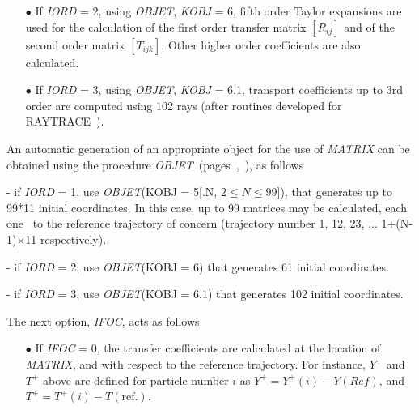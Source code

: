{\begin{itemize}
\begin{eqnarray}
\Delta \phi_Y =  A\!\tan \dfrac{R_{12}}{(R_{11}\beta_{Y,\textsl{objet}} - R_{12}\alpha_{Y,\textsl{objet}})}, ~ ~ \Delta \phi_Z =  A\!\tan\dfrac{R_{34}}{(R_{33}\beta_{Z,\textsl{objet}} - R_{34}\alpha_{Z,\textsl{objet}})} , \\[3ex]
~ ~ ~   \phi_{Y, Z} \rightarrow \phi_{Y,Z} + 2 \pi ~ ~ ~ 
\textrm{if} ~ \phi_{Y,Z} < 0, \textrm{given} ~ ~ [0,\pi] \textrm{ Atan determination}   \nonumber
\end{eqnarray}
\noindent and print these out. 

\item[$\bullet$] If \textsl{IORD} = 2, using \textsl{OBJET}, \textsl{KOBJ} = 6, fifth order Taylor expansions are used for the 
calculation of the first order transfer matrix $ [R_{ij}] $ and of 
the second order matrix $[T_{ijk}]$.  Other higher order coefficients are also calculated. 

\item[$\bullet$] If \textsl{IORD} = 3, using \textsl{OBJET}, \textsl{KOBJ} = 6.1, 
transport coefficients up to 3rd order are computed using 102 rays
(after routines developed for  RAYTRACE~\cite{RAYTRACE,RAYTRACECoeffs}). 
\end{itemize}

\medskip

\noindent An automatic generation of an appropriate object for the use of \textsl{MATRIX}  can be obtained 
using the procedure \textsl{OBJET}~(pages~\pageref{OBJET},~\pageref{OBJET-B}), as follows


\noindent - if  \textsl{IORD} = 1, use \textsl{OBJET}(KOBJ = 5[.N, $2\leq N \leq 99$]), 
that generates up to 99*11 initial coordinates. In this case, up to 99 matrices 
may be calculated, each one \wrt\ to the reference trajectory of concern (trajectory number 
1, 12, 23, ... 1+(N-1)$\times$11 respectively). 

\noindent - if  \textsl{IORD} = 2, use \textsl{OBJET}(KOBJ = 6)  that generates 
  61 initial coordinates. 

\noindent - if  \textsl{IORD} = 3, use \textsl{OBJET}(KOBJ = 6.1)  that generates 
 102 initial coordinates. 


\medskip

\noindent The next option, \textsl{IFOC}, acts as follows \par

\begin{itemize}
\item[$\bullet$] If \textsl{IFOC} = 0,  the transfer coefficients are calculated
at the location of \textsl{MATRIX}, and with respect to the reference trajectory. 
For instance, $ Y^+ $ and $ T^+ $ above are defined for particle number $ i $ as 
$Y^+=Y^+(i)-Y(Ref)$,  and $ T^+=T^+(i)-T(\textrm{ref.})$.  


\end{itemize}}
